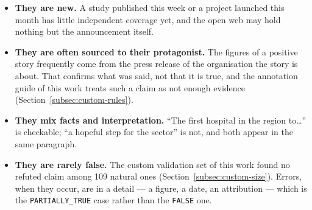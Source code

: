 \begin{itemize}
    \item \textbf{They are new.} A study published this week or a
    project launched this month has little independent coverage yet,
    and the open web may hold nothing but the announcement itself.
    \item \textbf{They are often sourced to their protagonist.} The
    figures of a positive story frequently come from the press release
    of the organisation the story is about. That confirms what was
    said, not that it is true, and the annotation guide of this work
    treats such a claim as not enough evidence
    (Section~\ref{subsec:custom-rules}).
    \item \textbf{They mix facts and interpretation.} ``The first
    hospital in the region to\ldots'' is checkable; ``a hopeful step
    for the sector'' is not, and both appear in the same paragraph.
    \item \textbf{They are rarely false.} The custom validation set of
    this work found no refuted claim among 109 natural ones
    (Section~\ref{subsec:custom-size}). Errors, when they occur, are in
    a detail --- a figure, a date, an attribution --- which is the
    \texttt{PARTIALLY\_TRUE} case rather than the \texttt{FALSE} one.
\end{itemize}
